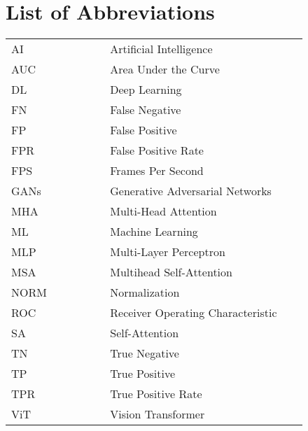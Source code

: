 \section*{List of Abbreviations}
\begin{table}[h]
    \centering
    \renewcommand{\arraystretch}{1.5}
    \begin{tabular}{@{}p{0.3\linewidth}p{0.6\linewidth}@{}}
        AI   & Artificial Intelligence           \\
        AUC  & Area Under the Curve              \\
        DL   & Deep Learning                     \\
        FN   & False Negative                    \\
        FP   & False Positive                    \\
        FPR  & False Positive Rate               \\
        FPS  & Frames Per Second                 \\
        GANs & Generative Adversarial Networks   \\
        MHA  & Multi-Head Attention              \\
        ML   & Machine Learning                  \\
        MLP  & Multi-Layer Perceptron            \\
        MSA  & Multihead Self-Attention          \\
        NORM & Normalization                     \\
        ROC  & Receiver Operating Characteristic \\
        SA   & Self-Attention                    \\
        TN   & True Negative                     \\
        TP   & True Positive                     \\
        TPR  & True Positive Rate                \\
        ViT  & Vision Transformer                \\
    \end{tabular}
\end{table}

